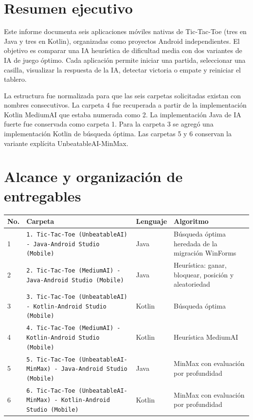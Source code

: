 \documentclass[stu,a4paper,12pt,floatsintext]{apa7}
\newcommand{\carpeta}[1]{\texttt{\scriptsize #1}}
\begin{document}
\newpage
{}
\tableofcontents
\newpage
{}
\setlength{\parskip}{7pt}

\section{Resumen ejecutivo}
Este informe documenta seis aplicaciones móviles nativas de Tic-Tac-Toe
(tres en Java y tres en Kotlin), organizadas como proyectos Android
independientes. El objetivo es comparar una IA heurística de dificultad media
con dos variantes de IA de juego óptimo. Cada aplicación permite iniciar una
partida, seleccionar una casilla, visualizar la respuesta de la IA, detectar
victoria o empate y reiniciar el tablero.

La estructura fue normalizada para que las seis carpetas solicitadas existan
con nombres consecutivos. La carpeta 4 fue recuperada a partir de la
implementación Kotlin MediumAI que estaba numerada como 2. La implementación
Java de IA fuerte fue conservada como carpeta 1. Para la carpeta 3 se agregó
una implementación Kotlin de búsqueda óptima. Las carpetas 5 y 6 conservan la
variante explícita UnbeatableAI-MinMax.

\section{Alcance y organización de entregables}
\begin{longtable}{p{}p{}p{}p{}}
\toprule
\textbf{No.} & \textbf{Carpeta} & \textbf{Lenguaje} & \textbf{Algoritmo}\\
\midrule
1 & \carpeta{1. Tic-Tac-Toe (UnbeatableAI) - Java-Android Studio (Mobile)}
  & Java & Búsqueda óptima heredada de la migración WinForms\\
2 & \carpeta{2. Tic-Tac-Toe (MediumAI) - Java-Android Studio (Mobile)}
  & Java & Heurística: ganar, bloquear, posición y aleatoriedad\\
3 & \carpeta{3. Tic-Tac-Toe (UnbeatableAI) - Kotlin-Android Studio (Mobile)}
  & Kotlin & Búsqueda óptima\\
4 & \carpeta{4. Tic-Tac-Toe (MediumAI) - Kotlin-Android Studio (Mobile)}
  & Kotlin & Heurística MediumAI\\
5 & \carpeta{5. Tic-Tac-Toe (UnbeatableAI-MinMax) - Java-Android Studio (Mobile)}
  & Java & MinMax con evaluación por profundidad\\
6 & \carpeta{6. Tic-Tac-Toe (UnbeatableAI-MinMax) - Kotlin-Android Studio (Mobile)}
  & Kotlin & MinMax con evaluación por profundidad\\
\bottomrule
\end{longtable}
\end{document}
